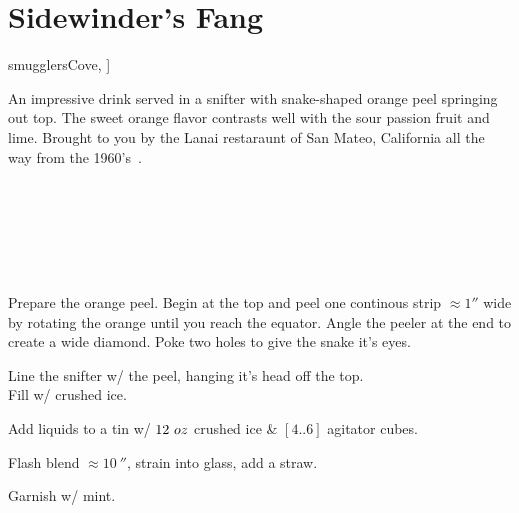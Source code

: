 \section[Sidewinder's Fang]{Sidewinder's Fang~}


\begin{recipestats}[
	servings=1,
	preptime=10~\minute,
	original=\citeauthor{smugglersCove}~\cite[p.~62]{smugglersCove},
]
\end{recipestats}

\begin{recipeabstract}
	An impressive drink served in a snifter with snake-shaped orange peel springing out top.
	The sweet orange flavor contrasts well with the sour passion fruit and lime.
	Brought to you by the Lanai restaraunt of San Mateo, California all the way from the 1960's~\cite{smugglersCove}.
\end{recipeabstract}


\begin{ingredientcolumns}[1]
	\begin{ingredientblock}
		\\
		\\
		\\
		\\
		\\
	\end{ingredientblock}
\end{ingredientcolumns}


\begin{preparation}
	\item Prepare the orange peel.
		Begin at the top and peel one continous strip $\approx1''$ wide by rotating the orange until you reach the equator.
		Angle the peeler at the end to create a wide diamond.
		Poke two holes to give the snake it's eyes.
	\item Line the snifter w/ the peel, hanging it's head off the top.\\
		Fill w/ crushed ice.
	\item Add liquids to a tin w/ $12~oz$ crushed ice \& $[4..6]$ agitator cubes.
	\item Flash blend $\approx10~\second$, strain into glass, add a straw.
	\item Garnish w/ mint.
\end{preparation}


\recipeend%
